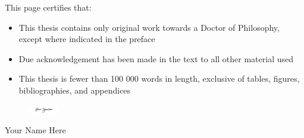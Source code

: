 This page certifies that:
\begin{itemize}
\item This thesis contains only original work towards a Doctor of Philosophy, except where indicated in the preface
\item Due acknowledgement has been made in the text to all other material used
\item This thesis is fewer than 100 000 words in length, exclusive of tables, figures, bibliographies, and appendices
\end{itemize}


\vspace{3cm}


\begin{figure}[h!]
  \raggedleft
  \includegraphics[width=0.12\textwidth]{figures/signature.png}
\end{figure}
\begin{flushright}
Your Name Here
\end{flushright}

